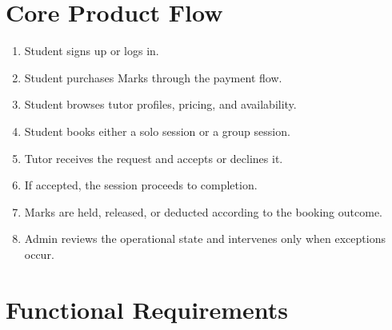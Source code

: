 \documentclass[11pt,a4paper]{article}
\begin{document}
\section{Core Product Flow}

\begin{enumerate}
	\item Student signs up or logs in.
	\item Student purchases Marks through the payment flow.
	\item Student browses tutor profiles, pricing, and availability.
	\item Student books either a solo session or a group session.
	\item Tutor receives the request and accepts or declines it.
	\item If accepted, the session proceeds to completion.
	\item Marks are held, released, or deducted according to the booking outcome.
	\item Admin reviews the operational state and intervenes only when exceptions occur.
\end{enumerate}

\section{Functional Requirements}
\end{document}
